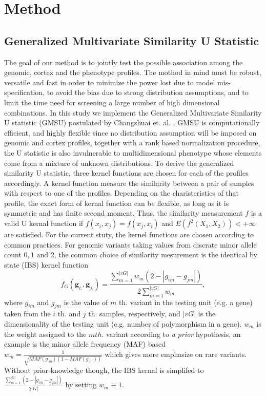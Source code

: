 \section{Method}

\subsection{Generalized Multivariate Similarity U Statistic}
The goal of our method is to jointly test the possible association among the genomic, cortex and the phenotype profiles. The mothod in mind must be robust, versatile and fast in order to minimize the power lost due to model mis-specification, to avoid the bias due to strong distribution assumptions, and to limit the time need for screening a large number of high dimensional combinations. In this study we implement the Generalized Multivariate Similarity U statistic (GMSU) postulated by Changshuai et. al. \cite{HWU}. GMSU is computationally efficient, and highly flexible since no distribution assumption will be imposed on genomic and cortex profiles, together with a rank based normalization procedure, the U statistic is also invulnerable to multidimensional phenotype whose elements come from a mixture of unknown distributions.
To derive the generalized similarity U statistic, three kernel functions are chosen for each of the profiles accordingly. A kernel function measure the similarity between a pair of samples with respect to one of the profiles. Depending on the charisteristics of that profile, the exact form of kernal function can be flexible, as long as it is symmetric and has finite second moment. Thus, the similarity measurement $f$ is a valid U kernal function if $f(x_i,x_j)=f(x_j,x_i)$ and $E(f^2(X_1, X_2))<+\infty$ are satisfied. For the current stuty, the kernel functions are chosen according to common practices.
\newcommand{\vg}{\boldsymbol{g}}
\newcommand{\vv}{\boldsymbol{v}}
\newcommand{\vy}{\boldsymbol{y}}
\newcommand{\vG}{\boldsymbol{G}}
\newcommand{\vV}{\boldsymbol{V}}
\newcommand{\vY}{\boldsymbol{Y}}
\newcommand{\vq}{\boldsymbol{q}}
For genomic variants taking values from discrate minor allele count ${0, 1 \textrm{ and } 2}$, the common choice of similarity mesurement is the identical by state (IBS) kernel function
\label{eq:wSG}
\[ f_G(\vg_{i.}, \vg_{j.}) = \frac{\sum_{m=1}^{|vG|}{w_m(2 - |g_{im} - g_{jm}|)}} {2\sum_{m=1}^{|vG|}{w_m}}, \]
where $g_{im}$ and $g_{jm}$ is the value of $m$ th. variant in the testing unit (e.g. a gene) taken from the $i$ th. and $j$ th. samples, respectively, and $|vG|$ is the dimensionality of the testing unit (e.g. number of polymorphism in a gene). $w_m$ is the weight assigned to the $m th.$ variant according to \textit{a prior} hypothesis, an example is the minor allele frequency (MAF) based $w_m=\frac{1}{\sqrt{MAF(g_{.m})(1-MAF(g_{.m}))}}$ which gives more emphasize on rare variants. Without prior knowledge though, the IBS kernal is simplifed to $\frac{\sum_{m = 1}^{|G|}{(2-|g_{im} - g_{jm}|)}}{2|G|}$ by setting $w_m \equiv 1$.

